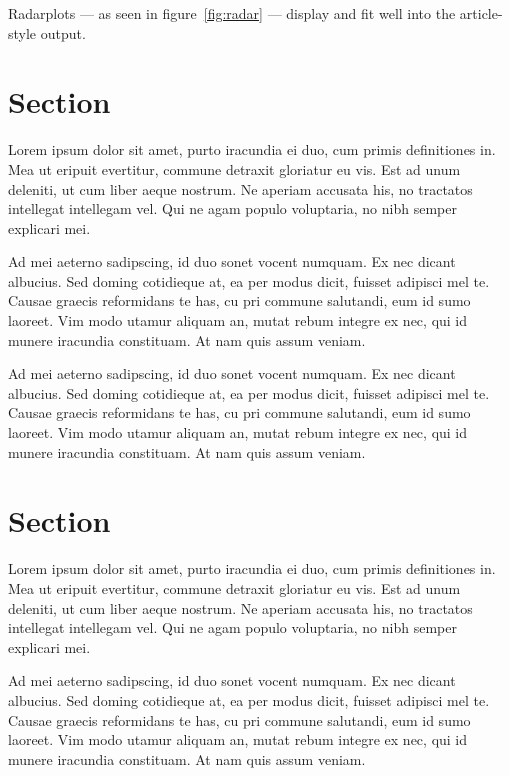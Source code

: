 \documentclass[10pt,a4paper,twocolumn,german]{article}
\begin{document}
	Radarplots --- as seen in figure~\ref{fig:radar} --- display and fit well into the article-style output. 
	

\section{Section}

	Lorem ipsum dolor sit amet, purto iracundia ei duo, cum primis definitiones in.
	Mea ut eripuit evertitur, commune detraxit gloriatur eu vis.
	Est ad unum deleniti, ut cum liber aeque nostrum.
	Ne aperiam accusata his, no tractatos intellegat intellegam vel.
	Qui ne agam populo voluptaria, no nibh semper explicari mei.
	
	Ad mei aeterno sadipscing, id duo sonet vocent numquam.
	Ex nec dicant albucius. Sed doming cotidieque at, ea per modus dicit, fuisset adipisci mel te.
	Causae graecis reformidans te has, cu pri commune salutandi, eum id sumo laoreet.
	Vim modo utamur aliquam an, mutat rebum integre ex nec, qui id munere iracundia constituam.
	At nam quis assum veniam.	
	
	Ad mei aeterno sadipscing, id duo sonet vocent numquam.
	Ex nec dicant albucius. Sed doming cotidieque at, ea per modus dicit, fuisset adipisci mel te.
	Causae graecis reformidans te has, cu pri commune salutandi, eum id sumo laoreet.
	Vim modo utamur aliquam an, mutat rebum integre ex nec, qui id munere iracundia constituam.
	At nam quis assum veniam.	
\section{Section}

	Lorem ipsum dolor sit amet, purto iracundia ei duo, cum primis definitiones in.
	Mea ut eripuit evertitur, commune detraxit gloriatur eu vis.
	Est ad unum deleniti, ut cum liber aeque nostrum.
	Ne aperiam accusata his, no tractatos intellegat intellegam vel.
	Qui ne agam populo voluptaria, no nibh semper explicari mei.
	
	Ad mei aeterno sadipscing, id duo sonet vocent numquam.
	Ex nec dicant albucius. Sed doming cotidieque at, ea per modus dicit, fuisset adipisci mel te.
	Causae graecis reformidans te has, cu pri commune salutandi, eum id sumo laoreet.
	Vim modo utamur aliquam an, mutat rebum integre ex nec, qui id munere iracundia constituam.
	At nam quis assum veniam.	
	
\end{document}
